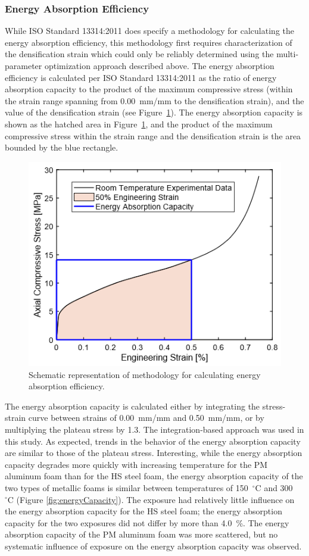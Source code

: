 \documentclass[review]{elsarticle}
\begin{document}
\subsubsection{Energy Absorption Efficiency}

While ISO Standard 13314:2011 does specify a methodology for calculating the energy absorption efficiency, this methodology first requires characterization of the densification strain which could only be reliably determined using the multi-parameter optimization approach described above. The energy absorption efficiency is calculated per ISO Standard 13314:2011 as the ratio of energy absorption capacity to the product of the maximum compressive stress (within the strain range spanning from 0.00~mm/mm to the densification strain), and the value of the densification strain (see Figure~\ref{EnAbsEffExpl}). The energy absorption capacity is shown as the hatched area in Figure~\ref{EnAbsEffExpl}, and the product of the maximum compressive stress within the strain range and the densification strain is the area bounded by the blue rectangle.

\begin{figure}[htbp]
	\begin{center}
		\includegraphics[width=0.60\linewidth]
		{Tex-Figures/Fig20-energyAbsorptionEfficiency.png}
		\vspace{-0.2cm}
		\caption{Schematic representation of methodology for calculating energy absorption efficiency.}
		\label{EnAbsEffExpl}
	\end{center}
\end{figure}

The energy absorption capacity is calculated either by integrating the stress-strain curve between strains of 0.00~mm/mm and 0.50~mm/mm, or by multiplying the plateau stress by 1.3. The integration-based approach was used in this study. As expected, trends in the behavior of the energy absorption capacity are similar to those of the plateau stress. Interesting, while the energy absorption capacity degrades more quickly with increasing temperature for the PM aluminum foam than for the HS steel foam, the energy absorption capacity of the two types of metallic foams is similar between temperatures of 150~$^\circ\mathrm{C}$ and 300~$^\circ\mathrm{C}$ (Figure \ref{fig:energyCapacity}). The exposure had relatively little influence on the energy absorption capacity for the HS steel foam; the energy absorption capacity for the two exposures did not differ by more than 4.0~\%. The energy absorption capacity of the PM aluminum foam was more scattered, but no systematic influence of exposure on the energy absorption capacity was observed.
\end{document}
